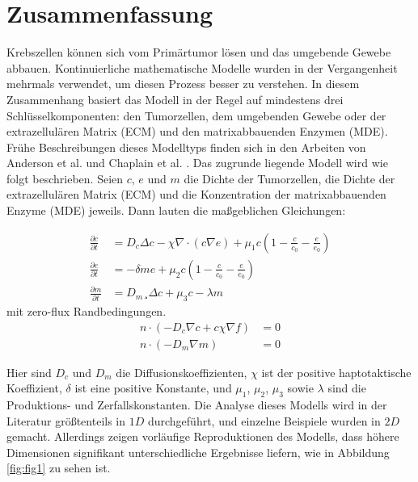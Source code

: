 \section*{Zusammenfassung}

Krebszellen können sich vom Primärtumor lösen und das umgebende Gewebe abbauen. 
Kontinuierliche mathematische Modelle wurden in der Vergangenheit mehrmals verwendet, 
um diesen Prozess besser zu verstehen. In diesem Zusammenhang basiert das Modell 
in der Regel auf mindestens drei Schlüsselkomponenten: den Tumorzellen, dem umgebenden 
Gewebe oder der extrazellulären Matrix (ECM) und den matrixabbauenden Enzymen (MDE). 
Frühe Beschreibungen dieses Modelltyps finden sich in den Arbeiten von Anderson et al. \cite{anderson_continuous_1998,anderson_mathematical_2000} 
und Chaplain et al. \cite{anderson_continuous_1998,chaplain_mathematical_2006,chaplain_mathematical_2006-1,franssen_mathematical_2019}. 
Das zugrunde liegende Modell wird wie folgt beschrieben.
Seien $c$, $e$ und $m$ die Dichte der Tumorzellen, die Dichte der extrazellulären 
Matrix (ECM) und die Konzentration der matrixabbauenden Enzyme (MDE) jeweils. Dann 
lauten die maßgeblichen Gleichungen:

\begin{align*}
	\frac{\partial c}{\partial t} &= D_c \Delta c - \chi \nabla \cdot (c\nabla e) + \mu_1 c\left(1-\frac{c}{c_0}-\frac{e}{e_0}\right)\\
	\frac{\partial e}{\partial t} &= -\delta m e  + \mu_2 c\left(1-\frac{c}{c_0}-\frac{e}{e_0}\right)\\
	\frac{\partial m}{\partial t} &= D_m¸ \Delta c + \mu_3 c - \lambda m
\end{align*}
mit zero-flux Randbedingungen. 
\begin{align*}
	n\cdot (-D_c \nabla c + c \chi\nabla f) &= 0 \\
	n \cdot (-D_m\nabla m ) &= 0
\end{align*}

\noindent Hier sind $D_c$ und $D_m$ die Diffusionskoeffizienten, $\chi$ ist der 
positive haptotaktische Koeffizient, $\delta$ ist eine positive Konstante, und 
$\mu_1$, $\mu_2$, $\mu_3$ sowie $\lambda$ sind die Produktions- und Zerfallskonstanten. \newline
Die Analyse dieses Modells wird in der Literatur größtenteils in $1D$ durchgeführt, 
und einzelne Beispiele wurden in $2D$ gemacht. Allerdings zeigen vorläufige 
Reproduktionen des Modells, dass höhere Dimensionen signifikant unterschiedliche 
Ergebnisse liefern, wie in Abbildung \ref{fig:fig1} zu sehen ist.

